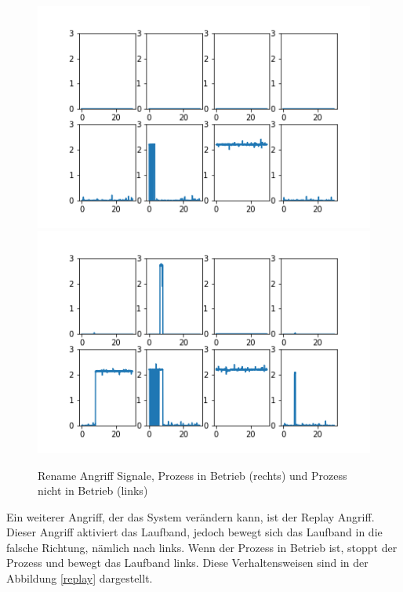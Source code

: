 \documentclass[12pt,a4paper]{scrartcl}
\numberwithin{equation}{section}
\begin{document}
\begin{figure}[ht!]
	\centering
	  \includegraphics[scale=0.75]{rename_angriff.png}
	  \includegraphics[scale=0.75]{rename_angriff_process_on.png}
	  \caption{Rename Angriff Signale, Prozess in Betrieb (rechts) und Prozess nicht in Betrieb (links)}
	\label{rename_angriff}
\end{figure}

Ein weiterer Angriff, der das System verändern kann, ist der Replay Angriff. Dieser Angriff aktiviert das Laufband, jedoch bewegt sich das Laufband in die falsche Richtung, nämlich nach links. Wenn der Prozess in Betrieb ist, stoppt der Prozess und bewegt das Laufband links. Diese Verhaltensweisen sind in der Abbildung \ref{replay} dargestellt. 
\end{document}

